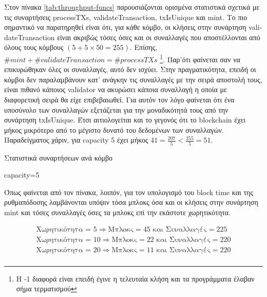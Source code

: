 \documentclass{article}
\newcommand{\eng}[1]{\foreignlanguage{english}{#1}} %
\begin{document}
Στον πίνακα \ref{tab:throughput-funcs} παρουσιάζονται ορισμένα στατιστικά
σχετικά με τις συναρτήσεις \eng{processTXs}, \eng{validateTransaction},
\eng{txIsUnique} και \eng{mint}. Το πιο σημαντικό να παρατηρηθεί είναι ότι, για
κάθε κόμβο, οι κλήσεις στην συνάρτηση \eng{validateTransaction} είναι ακριβώς
τόσες όσες και οι συναλλαγές που αποστέλλονται από όλους τους κόμβους $\left(5
+ 5 \times 50 = 255 \right)$. Επίσης, $\#mint + \#validateTransaction =
\#processTXs$ \footnote{Η -1 διαφορά είναι επειδή έγινε η τελευταία κλήση και τα
προγράμματα έλαβαν σήμα τερματισμού}. Παρ'ότι φαίνεται σαν να επικυρώθηκαν όλες
οι συναλλαγές, αυτό δεν ισχύει. Στην πραγματικότητα, επειδή οι κόμβοι δεν 
παραλαμβάνουν κατ' ανάγκην τις συναλλαγές με την σειρά αποστολή τους, είναι πιθανό
κάποιος \eng{validator} να ακυρώσει κάποια συναλλαγή η οποία με διαφορετική σειρά
θα είχε επιβεβαιωθεί. Για αυτόν τον λόγο φαίνεται ότι ένα υποσύνολο των
συναλλαγών εξετάζεται για την μοναδικότητά τους από την συνάρτηση
\eng{txIsUnique}. Έτσι αιτιολογείται και το γεγονός ότι το \eng{blockchain}
έχει μήκος μικρότερο από το μέγιστο δυνατό του δεδομένων των συναλλαγών.
Παραδείγματος χάριν, για \eng{capacity 5} έχει μήκος $41 = \frac{207}{5} <
\frac{255}{5} = 51$.


\begin{table}[ht]
    \caption{Στατιστικά συναρτήσεων ανά κόμβο} 
    \label{tab:throughput-funcs}
    \begin{subtable}{\textwidth}
        \centering
        \caption{\eng{capacity=5}}
        \label{tab:throughput-funcs-1}
    \end{subtable}
\end{table}

Όπως φαίνεται από τον πίνακα, λοιπόν, για τον υπολογισμό του \eng{block time} και
της ρυθμαπόδοσης λαμβάνονται υπόψιν τόσα μπλοκς όσα και οι κλήσεις στην συνάρτηση
\eng{mint} και τόσες συναλλαγές όσες τα μπλοκς επί την εκάστοτε χωρητικότητα.

\begin{equation}
    \begin{gathered}
        \text{Χωρητικότητα = 5} \Rightarrow \text{Μπλοκς} = 45 \text{ και } \text{Συναλλαγές} = 225 \\
        \text{Χωρητικότητα = 10} \Rightarrow \text{Μπλοκς} = 22 \text{ και } \text{Συναλλαγές} = 220 \\
        \text{Χωρητικότητα = 20} \Rightarrow \text{Μπλοκς} = 11 \text{ και } \text{Συναλλαγές} = 220 \\
    \end{gathered}
\end{equation}
\end{document}
